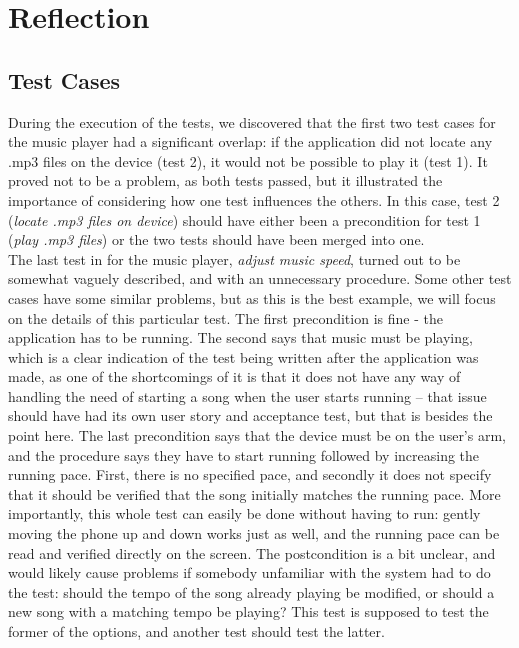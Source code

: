 \section{Reflection}
\subsection{Test Cases}
During the execution of the tests, we discovered that the first two test cases for the music player had a significant overlap: if the application did not locate any .mp3 files on the device (test 2), it would not be possible to play it (test 1).
It proved not to be a problem, as both tests passed, but it illustrated the importance of considering how one test influences the others.
In this case, test 2 (\textit{locate .mp3 files on device}) should have either been a precondition for test 1 (\textit{play .mp3 files}) or the two tests should have been merged into one.\\

The last test in for the music player, \textit{adjust music speed}, turned out to be somewhat vaguely described, and with an unnecessary procedure.
Some other test cases have some similar problems, but as this is the best example, we will focus on the details of this particular test.
The first precondition is fine - the application has to be running.
The second says that music must be playing, which is a clear indication of the test being written after the application was made, as one of the shortcomings of it is that it does not have any way of handling the need of starting a song when the user starts running -- that issue should have had its own user story and acceptance test, but that is besides the point here.
The last precondition says that the device must be on the user's arm, and the procedure says they have to start running followed by increasing the running pace.
First, there is no specified pace, and secondly it does not specify that it should be verified that the song initially matches the running pace.
More importantly, this whole test can easily be done without having to run: gently moving the phone up and down works just as well, and the running pace can be read and verified directly on the screen.
The postcondition is a bit unclear, and would likely cause problems if somebody unfamiliar with the system had to do the test: should the tempo of the song already playing be modified, or should a new song with a matching tempo be playing? This test is supposed to test the former of the options, and another test should test the latter.

